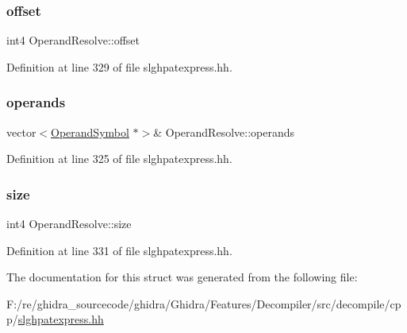 \subsubsection{\texorpdfstring{offset}{offset}}
{\footnotesize\ttfamily int4 Operand\+Resolve\+::offset}



Definition at line 329 of file slghpatexpress.\+hh.

\mbox{\label{struct_operand_resolve_a7449add86ddd91d05a9c094ce0db0caa}} 
\subsubsection{\texorpdfstring{operands}{operands}}
{\footnotesize\ttfamily vector$<$\mbox{\hyperlink{class_operand_symbol}{Operand\+Symbol}} $\ast$$>$\& Operand\+Resolve\+::operands}



Definition at line 325 of file slghpatexpress.\+hh.

\mbox{\label{struct_operand_resolve_a6a5483179571063bbc69a34044a367e7}} 
\subsubsection{\texorpdfstring{size}{size}}
{\footnotesize\ttfamily int4 Operand\+Resolve\+::size}



Definition at line 331 of file slghpatexpress.\+hh.



The documentation for this struct was generated from the following file\+:\begin{DoxyCompactItemize}
\item 
F\+:/re/ghidra\+\_\+sourcecode/ghidra/\+Ghidra/\+Features/\+Decompiler/src/decompile/cpp/\mbox{\hyperlink{slghpatexpress_8hh}{slghpatexpress.\+hh}}\end{DoxyCompactItemize}
